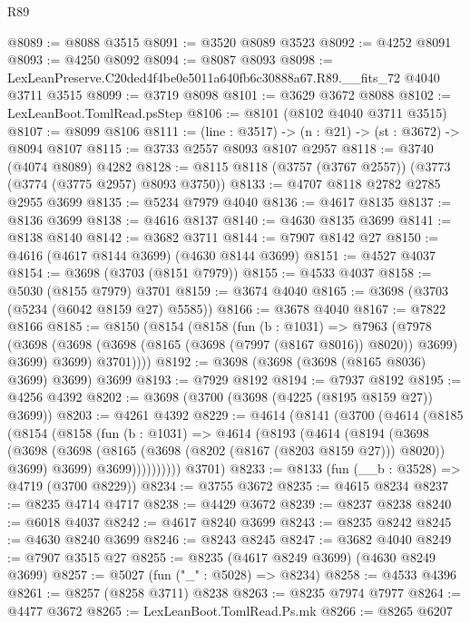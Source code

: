 \begin{lexlean}{R89}
\begin{coremodule}
@8089 := @8088 @3515
@8091 := @3520 @8089 @3523
@8092 := @4252 @8091
@8093 := @4250 @8092
@8094 := @8087 @8093
@8098 := LexLeanPreserve.C20ded4f4be0e5011a640fb6c30888a67.R89.__fits_72 @4040 @3711 @3515
@8099 := @3719 @8098
@8101 := @3629 @3672 @8088
@8102 := LexLeanBoot.TomlRead.psStep
@8106 := @8101 (@8102 @4040 @3711 @3515)
@8107 := @8099 @8106
@8111 := (line : @3517) -> (n : @21) -> (st : @3672) -> @8094 @8107
@8115 := @3733 @2557 @8093 @8107 @2957
@8118 := @3740 (@4074 @8089) @4282
@8128 := @8115 @8118 (@3757 (@3767 @2557)) (@3773 (@3774 (@3775 @2957) @8093 @3750))
@8133 := @4707 @8118 @2782 @2785 @2955 @3699
@8135 := @5234 @7979 @4040
@8136 := @4617 @8135
@8137 := @8136 @3699
@8138 := @4616 @8137
@8140 := @4630 @8135 @3699
@8141 := @8138 @8140
@8142 := @3682 @3711
@8144 := @7907 @8142 @27
@8150 := @4616 (@4617 @8144 @3699) (@4630 @8144 @3699)
@8151 := @4527 @4037
@8154 := @3698 (@3703 (@8151 @7979))
@8155 := @4533 @4037
@8158 := @5030 (@8155 @7979) @3701
@8159 := @3674 @4040
@8165 := @3698 (@3703 (@5234 (@6042 @8159 @27) @5585))
@8166 := @3678 @4040
@8167 := @7822 @8166
@8185 := @8150
    (@8154
      (@8158
        (fun (b : @1031) =>
        @7963
          (@7978
            (@3698 (@3698 (@3698 (@8165 (@3698 (@7997 (@8167 @8016)) @8020)) @3699) @3699) @3699)
            @3701))))
@8192 := @3698 (@3698 (@3698 (@8165 @8036) @3699) @3699) @3699
@8193 := @7929 @8192
@8194 := @7937 @8192
@8195 := @4256 @4392
@8202 := @3698 (@3700 (@3698 (@4225 (@8195 @8159 @27)) @3699))
@8203 := @4261 @4392
@8229 := @4614
    (@8141
      (@3700
        (@4614
          (@8185
            (@8154
              (@8158
                (fun (b : @1031) =>
                @4614
                  (@8193
                    (@4614
                      (@8194
                        (@3698
                          (@3698
                            (@3698 (@8165 (@3698 (@8202 (@8167 (@8203 @8159 @27))) @8020)) @3699)
                            @3699)
                          @3699))))))))))
      @3701)
@8233 := @8133 (fun (__b : @3528) => @4719 (@3700 @8229))
@8234 := @3755 @3672
@8235 := @4615 @8234
@8237 := @8235 @4714 @4717
@8238 := @4429 @3672
@8239 := @8237 @8238
@8240 := @6018 @4037
@8242 := @4617 @8240 @3699
@8243 := @8235 @8242
@8245 := @4630 @8240 @3699
@8246 := @8243 @8245
@8247 := @3682 @4040
@8249 := @7907 @3515 @27
@8255 := @8235 (@4617 @8249 @3699) (@4630 @8249 @3699)
@8257 := @5027 (fun ("_" : @5028) => @8234)
@8258 := @4533 @4396
@8261 := @8257 (@8258 @3711) @8238
@8263 := @8235 @7974 @7977
@8264 := @4477 @3672
@8265 := LexLeanBoot.TomlRead.Ps.mk
@8266 := @8265 @6207

\end{coremodule}
\end{lexlean}

